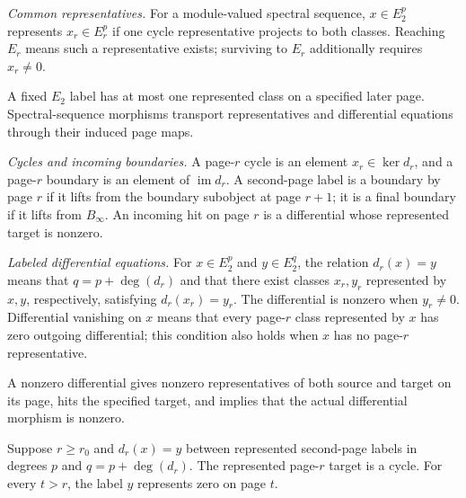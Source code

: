 \begin{definition}
\label{sem:SpectralSequence:representatives}
\label{sem:SpectralSequence:cycles-boundaries}
\label{sem:SpectralSequence:differential}
\textit{Common representatives.} For a module-valued spectral sequence, $x\in E_2^p$ represents $x_r\in E_r^p$ if one cycle representative projects to both classes. Reaching $E_r$ means such a representative exists; surviving to $E_r$ additionally requires $x_r\neq0$.

A fixed $E_2$ label has at most one represented class on a specified later page. Spectral-sequence morphisms transport representatives and differential equations through their induced page maps.

\textit{Cycles and incoming boundaries.} A page-$r$ cycle is an element $x_r\in\ker d_r$, and a page-$r$ boundary is an element of $\operatorname{im}d_r$. A second-page label is a boundary by page $r$ if it lifts from the boundary subobject at page $r+1$; it is a final boundary if it lifts from $B_\infty$. An incoming hit on page $r$ is a differential whose represented target is nonzero.

\textit{Labeled differential equations.} For $x\in E_2^p$ and $y\in E_2^q$, the relation $d_r(x)=y$ means that $q=p+\deg(d_r)$ and that there exist classes $x_r,y_r$ represented by $x,y$, respectively, satisfying $d_r(x_r)=y_r$. The differential is nonzero when $y_r\neq0$. Differential vanishing on $x$ means that every page-$r$ class represented by $x$ has zero outgoing differential; this condition also holds when $x$ has no page-$r$ representative.

A nonzero differential gives nonzero representatives of both source and target on its page, hits the specified target, and implies that the actual differential morphism is nonzero.

Suppose $r\geq r_0$ and $d_r(x)=y$ between represented second-page labels in degrees $p$ and $q=p+\deg(d_r)$. The represented page-$r$ target is a cycle. For every $t>r$, the label $y$ represents zero on page $t$.
\end{definition}


